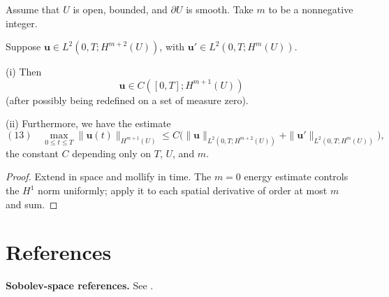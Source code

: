 \begin{theorem}
\label{thm:mappings-into-better-spaces}
Assume that $U$ is open, bounded, and $\partial U$ is smooth. Take $m$ to be a nonnegative integer.

Suppose $\mathbf{u} \in L^2(0,T;H^{m+2}(U))$, with $\mathbf{u}' \in L^2(0,T;H^m(U))$.

(i) Then
$$\mathbf{u} \in C([0,T];H^{m+1}(U))$$
(after possibly being redefined on a set of measure zero).

(ii) Furthermore, we have the estimate
$$(13) \quad \max_{0 \le t \le T} \|\mathbf{u}(t)\|_{H^{m+1}(U)} \le C\bigl(\|\mathbf{u}\|_{L^2(0,T;H^{m+2}(U))} + \|\mathbf{u}'\|_{L^2(0,T;H^m(U))}\bigr),$$
the constant $C$ depending only on $T$, $U$, and $m$.
\end{theorem}

\begin{proof}
\sketch Extend in space and mollify in time. The $m=0$ energy estimate controls the $H^1$ norm uniformly; apply it to each spatial derivative of order at most $m$ and sum.
\end{proof}

\section{References}
\label{sec:sobolev-references}
\textbf{Sobolev-space references.} See \cite{GilbargTrudinger1983,LiebLoss1997,Ziemer1989,EvansGariepy1992,Temam1977}.
